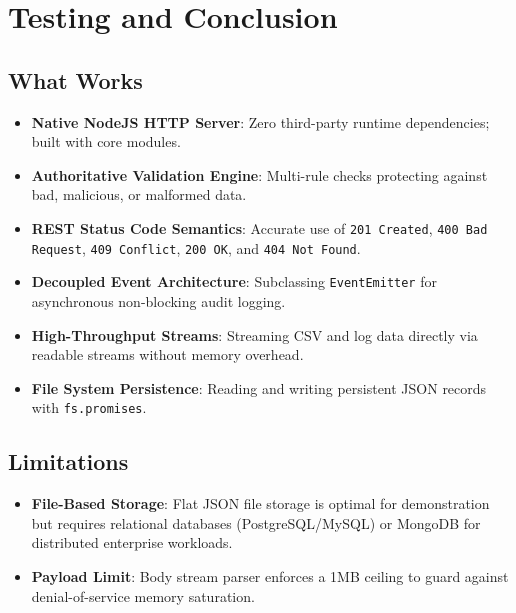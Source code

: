 \documentclass[11pt,a4paper]{article}
\begin{document}
\newpage

\section{Testing and Conclusion}

\subsection{What Works}
\begin{itemize}
    \item \textbf{Native NodeJS HTTP Server}: Zero third-party runtime dependencies; built with core modules.
    \item \textbf{Authoritative Validation Engine}: Multi-rule checks protecting against bad, malicious, or malformed data.
    \item \textbf{REST Status Code Semantics}: Accurate use of \texttt{201 Created}, \texttt{400 Bad Request}, \texttt{409 Conflict}, \texttt{200 OK}, and \texttt{404 Not Found}.
    \item \textbf{Decoupled Event Architecture}: Subclassing \texttt{EventEmitter} for asynchronous non-blocking audit logging.
    \item \textbf{High-Throughput Streams}: Streaming CSV and log data directly via readable streams without memory overhead.
    \item \textbf{File System Persistence}: Reading and writing persistent JSON records with \texttt{fs.promises}.
\end{itemize}

\subsection{Limitations}
\begin{itemize}
    \item \textbf{File-Based Storage}: Flat JSON file storage is optimal for demonstration but requires relational databases (PostgreSQL/MySQL) or MongoDB for distributed enterprise workloads.
    \item \textbf{Payload Limit}: Body stream parser enforces a 1MB ceiling to guard against denial-of-service memory saturation.
\end{itemize}
\end{document}
